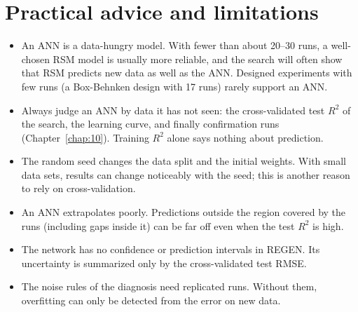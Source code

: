 \section{Practical advice and limitations}\label{sec:ch07-advice}

\begin{itemize}
  \item An ANN is a data-hungry model. With fewer than about 20--30 runs, a well-chosen RSM model is usually more
    reliable, and the search will often show that RSM predicts new data as well as the ANN. Designed experiments
    with few runs (a Box-Behnken design with 17 runs) rarely support an ANN.
  \item Always judge an ANN by data it has not seen: the cross-validated test $R^2$ of the search, the learning
    curve, and finally confirmation runs (Chapter~\ref{chap:10}). Training $R^2$ alone says nothing about prediction.
  \item The random seed changes the data split and the initial weights. With small data sets, results can change
    noticeably with the seed; this is another reason to rely on cross-validation.
  \item An ANN extrapolates poorly. Predictions outside the region covered by the runs (including gaps inside it)
    can be far off even when the test $R^2$ is high.
  \item The network has no confidence or prediction intervals in REGEN. Its uncertainty is summarized only by the
    cross-validated test RMSE.
  \item The noise rules of the diagnosis need replicated runs. Without them, overfitting can only be detected from
    the error on new data.
\end{itemize}
